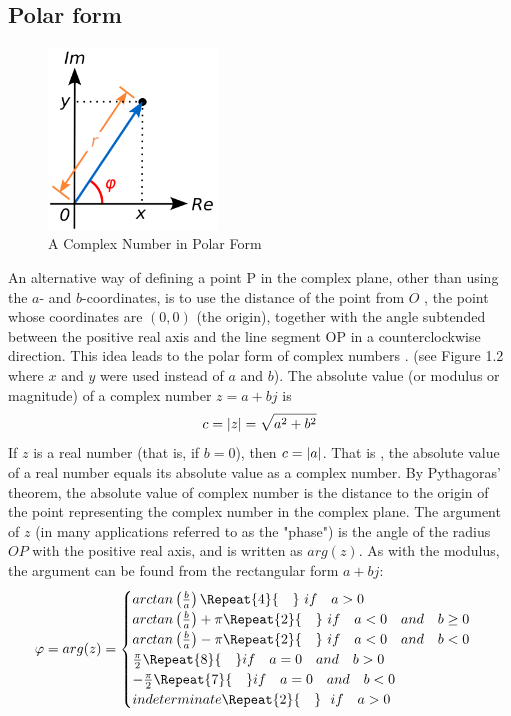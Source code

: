 \documentclass[12pt,oneside,openany]{memoir}
\numberwithin{equation}{subsection}
\DeclarePairedDelimiter{\abs}{\lvert}{\rvert}
\newcommand{\quads}[1]{\Repeat{#1}{\quad}}
\begin{document}
\subsection{Polar form}
\begin{figure}
	\centering
	\captionsetup{justification=centering}
	\includegraphics[width=0.4\textwidth]{images/complex_number_polar_form.png}
	\caption{A Complex Number in Polar Form}
\end{figure}
An alternative way of defining a point P in the complex plane, other than using
the \(a\)- and \(b\)-coordinates, is to use the distance of the point from \(O\)
, the point whose coordinates are \((0, 0)\) (the origin), together with the
angle subtended between the positive real axis and the line segment OP in a
counterclockwise direction. This idea leads to the polar form of complex numbers
. (see Figure 1.2 where \(x\) and \(y\) were used instead of \(a\) and \(b\)).
\bigbreak
The absolute value (or modulus or magnitude) of a complex number \(z = a + bj\)
is
\[c = \abs{z} = \sqrt{a^2 + b^2}\]
If \(z\) is a real number (that is, if \(b = 0\)), then \(c = \abs{a}\). That is
, the absolute value of a real number equals its absolute value as a complex
number. By Pythagoras' theorem, the absolute value of complex number is the
distance to the origin of the point representing the complex number in the
complex plane. 
\bigbreak
The argument of \(z\) (in many applications referred to as the "phase") is the
angle of the radius \(OP\) with the positive real axis, and is written as
\(arg(z)\). As with the modulus, the argument can be found from the rectangular
form \(a + bj\):
\[
	\varphi = arg(z) =
	\begin{cases}
		arctan\left(\frac{b}{a}\right) \quads{4} \ if \quad a > 0\\
		arctan\left(\frac{b}{a}\right) + \pi \quads{2} \ if \quad a < 0 
		\quad and \quad b \geq 0\\
		arctan\left(\frac{b}{a}\right) - \pi \quads{2} \ if \quad a < 0 
		\quad and \quad b < 0\\
		\frac{\pi}{2} \quads{8} if \quad a = 0 \quad and \quad b > 0\\
		-\frac{\pi}{2} \quads{7} if \quad a = 0 \quad and \quad b < 0\\
		indeterminate \quads{2} \ \ if \quad a > 0
	 \end{cases}
\]
\end{document}
